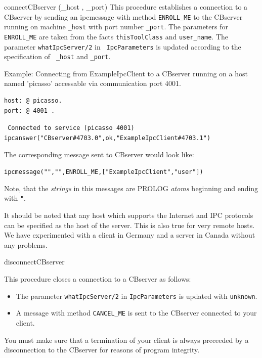 \begin{method}{connectCBserver (\_host , \_port)}
  This procedure establishes a connection to a CBserver by sending an
  ipcmessage with method {\tt ENROLL\_ME} to the CBserver running on
  machine {\tt \_host} with port number {\tt \_port}. The parameters
  for {\tt ENROLL\_ME} are taken from the facts {\tt thisToolClass}
  and {\tt user\_name}. The parameter {\tt whatIpcServer/2} in {\tt
    IpcParameters} is updated according to the specification of {\tt
    \_host} and {\tt \_port}.

  Example: Connecting from ExampleIpcClient to a CBserver running on a
  host named  'picasso' accessable via  communication port 4001.

\begin{verbatim}
host: @ picasso.
port: @ 4001 .
\end{verbatim}

{\tt
Connected to service (picasso 4001)\\
ipcanswer("CBserver\#4703.0",ok,"ExampleIpcClient\#4703.1")\\
}


The corresponding message sent to CBserver would look like:

\begin{center}
{\tt ipcmessage("","",ENROLL\_ME,["ExampleIpcClient","user"])}
\end{center}

Note, that the {\em strings} in this messages are PROLOG {\em atoms}
beginning and ending with \verb+"+.

It should be noted that any host which
supports the Internet and IPC protocols can be specified as the host
of the server. This is also true for very remote hosts. We have
experimented with a client in Germany and a server in Canada without
any problems.
\end{method}

\begin{method}{disconnectCBserver}

This procedure closes a connection to a CBserver as follows:
\begin{itemize}
\item The parameter {\tt whatIpcServer/2} in {\tt IpcParameters} is
  updated with {\tt unknown}.
\item A message with method {\tt CANCEL\_ME} is sent to the CBserver
  connected to your client. 
\end{itemize}
You must make sure that a termination of your client is always preceeded by 
a disconnection to the CBserver for reasons of program integrity.
\end{method}

